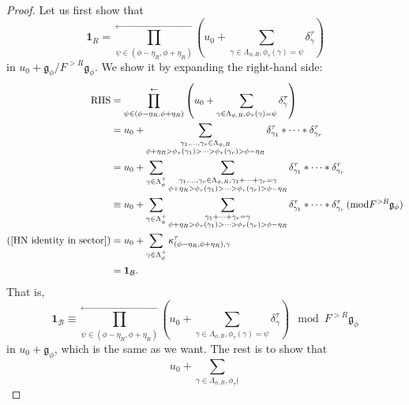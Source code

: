 \documentclass[a4paper,12pt]{amsart}
\numberwithin{equation}{section}
\newcommand{\mmod}{\mathrm{mod}}
\newcommand{\1}{\mathbf{1}}
\newcommand{\RHS}{\mathrm{RHS}}
\begin{document}
\begin{proof}
    Let us first show that
    \[\1_R=\prod_{\psi\in(\phi-\eta_R,\phi+\eta_R)}^\leftarrow\left(u_0+\sum_{\gamma\in\Lambda_{\phi,R},\phi_\tau(
    \gamma)=\psi}\delta^\tau_\gamma\right)\]
    in $u_0+\mathfrak{g}_\phi/F^{>R}\mathfrak{g}_\phi$.
    We show it by expanding the right-hand side:
    \begin{align*}
    \RHS&=\prod_{\psi\in(\phi-\eta_R,\phi+\eta_R)}^\leftarrow\left(u_0+\sum_{\gamma\in\Lambda_{\phi,R},\phi_\tau(
    \gamma)=\psi}\delta^\tau_\gamma\right)\\
    &=u_0+\sum_{\begin{subarray}{c}
        \gamma_1,\dots,\gamma_r\in\Lambda_{\phi,R}\\
        \phi+\eta_R>\phi_\tau(\gamma_1)>\dots>\phi_\tau(\gamma_r)>\phi-\eta_R\\
    \end{subarray}} \delta^\tau_{\gamma_1}*\dots*\delta^\tau_{\gamma_r}\\
    &=u_0+\sum_{\gamma\in\Lambda_\phi^+}\sum_{\begin{subarray}{c}
        \gamma_1,\dots,\gamma_r\in\Lambda_{\phi,R},\gamma_1+\dots+\gamma_r=\gamma\\
        \phi+\eta_R>\phi_\tau(\gamma_1)>\dots>\phi_\tau(\gamma_r)>\phi-\eta_R\\
    \end{subarray}} \delta^\tau_{\gamma_1}*\dots*\delta^\tau_{\gamma_r}\\
    &\equiv u_0+\sum_{\gamma\in\Lambda_\phi^+}\sum_{\begin{subarray}{c}
        \gamma_1+\dots+\gamma_r=\gamma\\
        \phi+\eta_R>\phi_\tau(\gamma_1)>\dots>\phi_\tau(\gamma_r)>\phi-\eta_R\\
    \end{subarray}} \delta^\tau_{\gamma_1}*\dots*\delta^\tau_{\gamma_r}\,(\mmod F^{>R}\mathfrak{g}_\phi)\\
    (\ref{HN identity in sector})&=u_0+\sum_{\gamma\in\Lambda_\phi^+}\kappa^\tau_{(\phi-\eta_R,\phi+\eta_R),\gamma}\\
    &=\1_\mathcal{B}.
    \end{align*}
    That is,
    \[\1_\mathcal{B}\equiv\prod_{\psi\in(\phi-\eta_R,\phi+\eta_R)}^\leftarrow\left(u_0+\sum_{\gamma\in\Lambda_{\phi,R},\phi_\tau(
    \gamma)=\psi}\delta^\tau_\gamma\right)\mod F^{>R}\mathfrak{g}_\phi\]
    in $u_0+\mathfrak{g}_\phi$, which is the same as we want. The rest is to show that
    \[u_0+\sum_{\gamma\in\Lambda_{\phi,R},\phi_\tau(
}\]
\end{proof}
\end{document}
